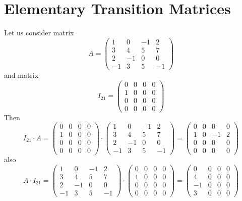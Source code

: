 \section{Elementary Transition Matrices}
Let us consider matrix 
\[
A = \begin{pmatrix}
1 & 0 & -1 & 2\\
3 & 4 & 5 & 7\\
2 & -1 & 0 & 0\\
-1 & 3 & 5 & -1
\end{pmatrix}
\]
and matrix 
\[
I_{21} = \begin{pmatrix}
0 & 0 & 0 & 0\\
1 & 0 & 0 & 0\\
0 & 0 & 0 & 0\\
0 & 0 & 0 & 0
\end{pmatrix}
\]
Then
\[
I_{21}\cdot A = \begin{pmatrix}
0 & 0 & 0 & 0\\
1 & 0 & 0 & 0\\
0 & 0 & 0 & 0\\
0 & 0 & 0 & 0
\end{pmatrix}\cdot \begin{pmatrix}
1 & 0 & -1 & 2\\
3 & 4 & 5 & 7\\
2 & -1 & 0 & 0\\
-1 & 3 & 5 & -1
\end{pmatrix} = \begin{pmatrix}
0 & 0 & 0 & 0\\
1 & 0 & -1 & 2\\
0 & 0 & 0 & 0\\
0 & 0 & 0 & 0
\end{pmatrix}
\]
also
\[
A \cdot I_{21} = \begin{pmatrix}
1 & 0 & -1 & 2\\
3 & 4 & 5 & 7\\
2 & -1 & 0 & 0\\
-1 & 3 & 5 & -1
\end{pmatrix}\cdot\begin{pmatrix}
0 & 0 & 0 & 0\\
1 & 0 & 0 & 0\\
0 & 0 & 0 & 0\\
0 & 0 & 0 & 0
\end{pmatrix} = \begin{pmatrix}
0 & 0 & 0 & 0\\
4 & 0 & 0 & 0\\
-1 & 0 & 0 & 0\\
3 & 0 & 0 & 0
\end{pmatrix}
\]
